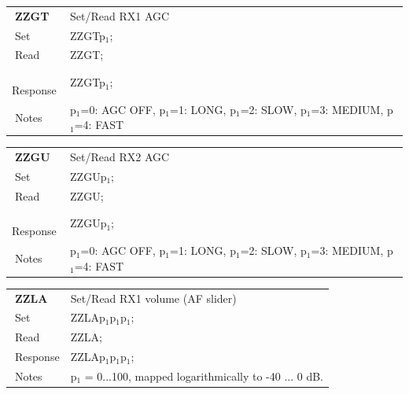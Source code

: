 \documentclass[12pt]{book}
\begin{document}
\begin{center}
\begin{tabular}{|p{2cm}|p{11cm}|}
\toprule
$\phantom{\Big|}$\textbf{\large ZZGT} & Set/Read RX1 AGC \\\cline{1-2}
$\phantom{\Big|}${\large Set} & {ZZGTp$_1$;} \\\hline
$\phantom{\Big|}${\large Read} & {ZZGT;} \\\hline
$\phantom{\Big|}${\large Response} & {ZZGTp$_1$;} \\\hline
$\phantom{\Big|}${\large Notes} & \multicolumn{1}{|p{11cm}|}{p$_1$=0: AGC OFF, p$_1$=1: LONG, p$_1$=2: SLOW, p$_1$=3: MEDIUM, p$_1$=4: FAST} \\
\bottomrule
\end{tabular}
\end{center}

\begin{center}
\begin{tabular}{|p{2cm}|p{11cm}|}
\toprule
$\phantom{\Big|}$\textbf{\large ZZGU} & Set/Read RX2 AGC \\\cline{1-2}
$\phantom{\Big|}${\large Set} & {ZZGUp$_1$;} \\\hline
$\phantom{\Big|}${\large Read} & {ZZGU;} \\\hline
$\phantom{\Big|}${\large Response} & {ZZGUp$_1$;} \\\hline
$\phantom{\Big|}${\large Notes} & \multicolumn{1}{|p{11cm}|}{p$_1$=0: AGC OFF, p$_1$=1: LONG, p$_1$=2: SLOW, p$_1$=3: MEDIUM, p$_1$=4: FAST} \\
\bottomrule
\end{tabular}
\end{center}

\begin{center}
\begin{tabular}{|p{2cm}|p{11cm}|}
\toprule
$\phantom{\Big|}$\textbf{\large ZZLA} & Set/Read RX1 volume (AF slider) \\\cline{1-2}
$\phantom{\Big|}${\large Set} & {ZZLAp$_1$p$_1$p$_1$;} \\\hline
$\phantom{\Big|}${\large Read} & {ZZLA;} \\\hline
$\phantom{\Big|}${\large Response} & {ZZLAp$_1$p$_1$p$_1$;} \\\hline
$\phantom{\Big|}${\large Notes} & \multicolumn{1}{|p{11cm}|}{p$_1$ = 0...100, mapped logarithmically to -40 ... 0 dB.} \\
\bottomrule
\end{tabular}
\end{center}
\end{document}

